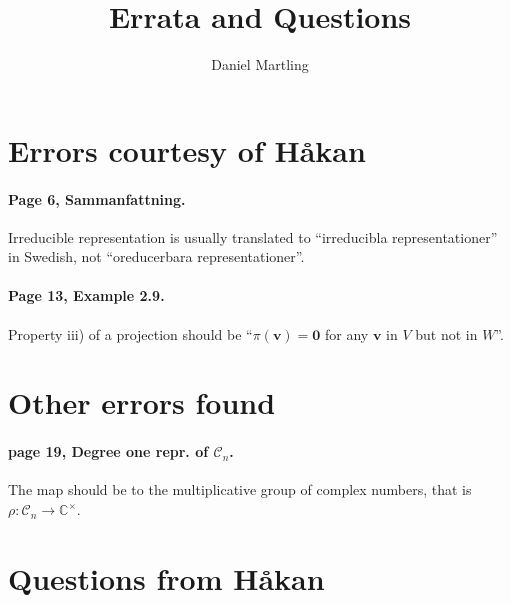 \documentclass[12pt,a4paper]{article}
\title{Errata and Questions}
\author{Daniel Martling}
\date{}
\theoremstyle{definition}
\theoremstyle{remark}
\numberwithin{equation}{section}
\newcommand{\CC}{\mathbb{C}}
\newcommand{\1}{\mathbf{1}}
\newcommand{\0}{\mathbf{0}}
\newcommand{\Cyc}{\mathcal{C}}%
\newcommand{\vvec}{\mathbf{v}}
\begin{document}
	\maketitle
	
	\section*{Errors courtesy of Håkan}
	
		\paragraph{Page 6, Sammanfattning.} Irreducible representation is usually translated to ``irreducibla representationer'' in Swedish, not ``oreducerbara representationer''.
		
		\paragraph{Page 13, Example 2.9.} Property iii) of a projection should be ``$\pi(\vvec) = \0$ for any $\vvec$ in $V$ but not in $W$''.
		
	\section*{Other errors found}
	
		\paragraph{page 19, Degree one repr. of $\Cyc_n$.} The map should be to the multiplicative group of complex numbers, that is $\rho: \Cyc_n \rightarrow \CC^\times$.
		
	\section*{Questions from Håkan}
	
\end{document}
